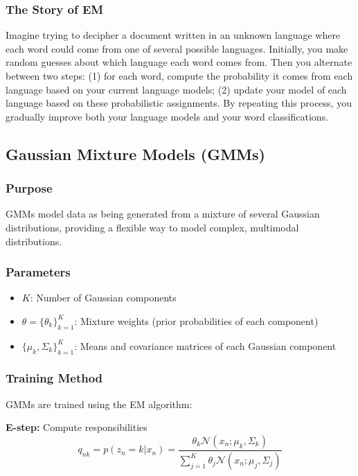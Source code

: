 \documentclass{article}
\begin{document}
\subsubsection{The Story of EM}
Imagine trying to decipher a document written in an unknown language where each word could come from one of several possible languages. Initially, you make random guesses about which language each word comes from. Then you alternate between two steps: (1) for each word, compute the probability it comes from each language based on your current language models; (2) update your model of each language based on these probabilistic assignments. By repeating this process, you gradually improve both your language models and your word classifications.

\subsection{Gaussian Mixture Models (GMMs)}

\subsubsection{Purpose}
GMMs model data as being generated from a mixture of several Gaussian distributions, providing a flexible way to model complex, multimodal distributions.

\subsubsection{Parameters}
\begin{itemize}
    \item $K$: Number of Gaussian components
    \item $\theta = \{\theta_k\}_{k=1}^K$: Mixture weights (prior probabilities of each component)
    \item $\{\mu_k, \Sigma_k\}_{k=1}^K$: Means and covariance matrices of each Gaussian component
\end{itemize}

\subsubsection{Training Method}
GMMs are trained using the EM algorithm:

\textbf{E-step:} Compute responsibilities
\begin{equation}
    q_{nk} = p(z_n = k|x_n) = \frac{\theta_k \mathcal{N}(x_n; \mu_k, \Sigma_k)}{\sum_{j=1}^K \theta_j \mathcal{N}(x_n; \mu_j, \Sigma_j)}
\end{equation}
\end{document}
